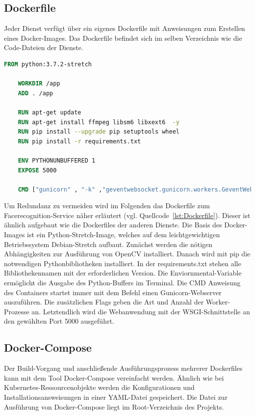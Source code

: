\subsection{Dockerfile}

Jeder Dienst verfügt über ein eigenes Dockerfile mit Anweisungen zum Erstellen eines Docker-Images.
Das Dockerfile befindet sich im selben Verzeichnis wie die Code-Dateien der Dienste.

\begin{lstlisting}[caption={Dockerfile},captionpos=b ,label={lst:Dockerfile},language=Dockerfile]
    FROM python:3.7.2-stretch
    
    WORKDIR /app
    ADD . /app
    
    RUN apt-get update
    RUN apt-get install ffmpeg libsm6 libxext6  -y
    RUN pip install --upgrade pip setuptools wheel
    RUN pip install -r requirements.txt
    
    ENV PYTHONUNBUFFERED 1
    EXPOSE 5000
    
    CMD ["gunicorn" , "-k" ,"geventwebsocket.gunicorn.workers.GeventWebSocketWorker", "-w", "3" , "--bind" , ":5000" , "run:app"]
    \end{lstlisting}

Um Redundanz zu vermeiden wird im Folgenden das Dockerfile zum Facerecognition-Service näher erläutert (vgl. Quellcode~\ref{lst:Dockerfile}).
Dieser ist ähnlich aufgebaut wie die Dockerfiles der anderen Dienste.
Die Basis des Docker-Images ist ein Python-Stretch-Image, welches auf dem leichtgewichtigen Betriebssystem Debian-Stretch aufbaut.
Zunächst werden die nötigen Abhängigkeiten zur Ausführung von OpenCV installiert.
Danach wird mit pip die notwendigen Pythonbibliotheken installiert.
In der requirements.txt stehen alle Bibliothekennamen mit der erforderlichen Version.
Die Enviornmental-Variable ermöglicht die Ausgabe des Python-Buffers im Terminal.
Die CMD Anweisung des Containers startet immer mit dem Befehl einen Gunicorn-Webserver auszuführen.
Die zusätzlichen Flags geben die Art und Anzahl der Worker-Prozesse an.
Letztendlich wird die Webanwendung mit der WSGI-Schnittstelle an den gewählten Port 5000 ausgeführt.

\subsection{Docker-Compose}

Der Build-Vorgang und anschließende Ausführungsprozess mehrerer Dockerfiles kann mit dem Tool Docker-Compose vereinfacht werden.
Ähnlich wie bei Kubernetes-Ressourcenobjekte werden die Konfigurationen und Installationsansweisungen in einer YAML-Datei gespeichert.
Die Datei zur Ausführung von Docker-Compose liegt im Root-Verzeichnis des Projekts.

